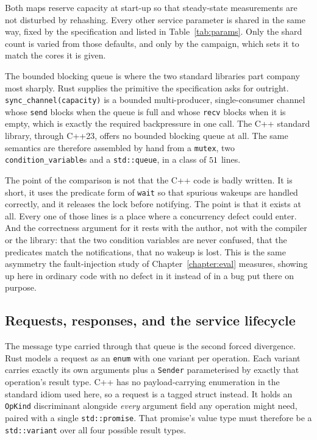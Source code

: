 \documentclass[english,oneside,a4paper,censored,csm,software-track-2020]{HYthesisML}
\begin{document}
Both maps reserve capacity at start-up so that steady-state measurements are not disturbed by
rehashing. Every other service parameter is shared in the same way, fixed by the specification
and listed in Table~\ref{tab:params}. Only the shard count is varied from those defaults, and
only by the campaign, which sets it to match the cores it is given.

The bounded blocking queue is where the two standard libraries part company most sharply. Rust
supplies the primitive the specification asks for outright. \texttt{sync\_channel(capacity)} is
a bounded multi-producer, single-consumer channel whose \texttt{send} blocks when the queue is
full and whose \texttt{recv} blocks when it is empty, which is exactly the required
backpressure in one call. The C++ standard library, through C++23, offers no
bounded blocking queue at all. The same semantics are therefore assembled by hand from a
\texttt{mutex}, two \texttt{condition\_variable}s and a \texttt{std::queue}, in a class of
$51$ lines.

The point of the comparison is not that the C++ code is badly written. It is short, it uses
the predicate form of \texttt{wait} so that spurious wakeups are handled correctly, and it
releases the lock before notifying. The point is that it exists at all. Every one of those lines
is a place where a concurrency defect could enter. And the correctness argument for it rests
with the author, not with the compiler or the library: that the two condition variables are
never confused, that the predicates match the notifications, that no wakeup is lost. This is the
same asymmetry the fault-injection study of Chapter~\ref{chapter:eval} measures, showing up here
in ordinary code with no defect in it instead of in a bug put there on purpose.

\subsection{Requests, responses, and the service lifecycle}\label{sec:tagged}
\label{sec:request}
The message type carried through that queue is the second forced divergence. Rust models a
request as an \texttt{enum} with one variant per
operation. Each variant carries exactly its own arguments plus a \texttt{Sender} parameterised
by exactly that operation's result type. C++ has no payload-carrying
enumeration in the standard idiom used here, so a request is a tagged struct instead. It holds an
\texttt{OpKind} discriminant alongside \emph{every} argument field any operation might need,
paired with a single \texttt{std::promise}. That promise's value type must therefore be a
\texttt{std::variant} over all four possible result types.
\end{document}
